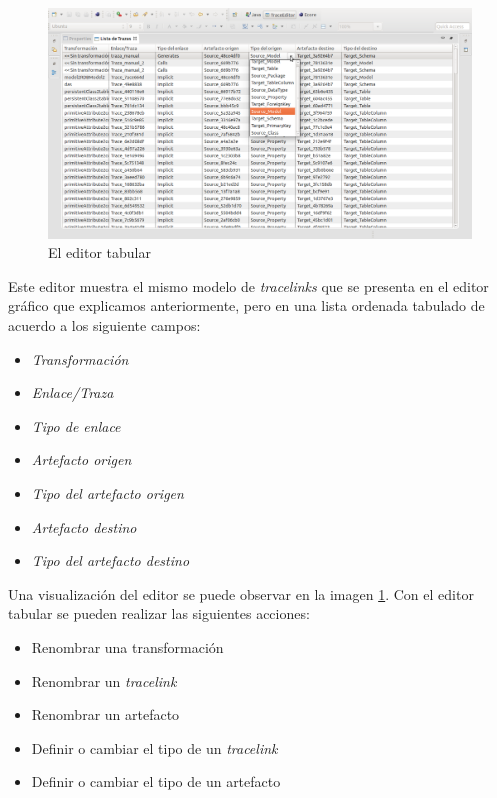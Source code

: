 \documentclass[a4paper,12pt,oneside,spanish]{book}
\begin{document}
\begin{figure}[hbtp]
\centering
\includegraphics[scale=.29]{./img/TraceEditorTabular}
\caption{El editor tabular}
\label{fig:TraceEditorTabular}
\end{figure}

Este editor muestra el mismo modelo de \textit{tracelinks} que se presenta en el editor gráfico que explicamos anteriormente, pero en una lista ordenada tabulado de acuerdo a los siguiente campos:

\begin{itemize}
\item \textsf{\textit{Transformación}}
\item \textsf{\textit{Enlace/Traza}}
\item \textsf{\textit{Tipo de enlace}}
\item \textsf{\textit{Artefacto origen}}
\item \textsf{\textit{Tipo del artefacto origen}}
\item \textsf{\textit{Artefacto destino}}
\item \textsf{\textit{Tipo del artefacto destino}}
\end{itemize}


Una visualización del editor se puede observar en la imagen \ref{fig:TraceEditorTabular}. Con el editor tabular se pueden realizar las siguientes acciones:

\begin{itemize}
\item Renombrar una transformación
\item Renombrar un \textit{tracelink}
\item Renombrar un artefacto
\item Definir o cambiar el tipo de un \textit{tracelink}
\item Definir o cambiar el tipo de un artefacto
\end{itemize}
\end{document}
